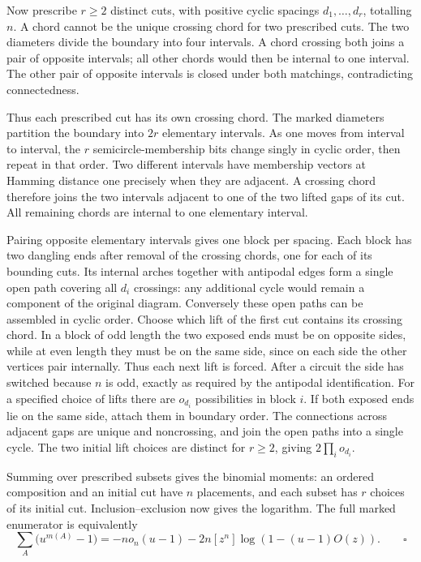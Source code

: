 Now prescribe \(r\ge2\) distinct cuts, with positive cyclic spacings
\(d_1,\ldots,d_r\), totalling \(n\). A chord cannot be the unique crossing
chord for two prescribed cuts. The two diameters divide the boundary into
four intervals. A chord crossing both joins a pair of opposite intervals;
all other chords would then be internal to one interval. The other pair of
opposite intervals is closed under both matchings, contradicting
connectedness.

Thus each prescribed cut has its own crossing chord. The marked diameters
partition the boundary into \(2r\) elementary intervals. As one moves from
interval to interval, the \(r\) semicircle-membership bits change singly in
cyclic order, then repeat in that order. Two different intervals have
membership vectors at Hamming distance one precisely when they are adjacent.
A crossing chord therefore joins the two intervals adjacent to one of the
two lifted gaps of its cut. All remaining chords are internal to one
elementary interval.

Pairing opposite elementary intervals gives one block per spacing. Each
block has two dangling ends after removal of the crossing chords, one for
each of its bounding cuts. Its internal arches together with antipodal
edges form a single open path covering all \(d_i\) crossings: any additional
cycle would remain a component of the original diagram. Conversely these
open paths can be assembled in cyclic order. Choose which lift of the first
cut contains its crossing chord. In a block of odd length the two exposed
ends must be on opposite sides, while at even length they must be on the
same side, since on each side the other vertices pair internally. Thus
each next lift is forced. After a circuit the side has switched because
\(n\) is odd, exactly as required by the antipodal identification. For a
specified choice of lifts there are \(o_{d_i}\) possibilities in block
\(i\). If both exposed ends lie on the same side, attach them in boundary
order. The connections across adjacent gaps are unique and noncrossing,
and join the open paths into a single cycle. The two initial lift choices
are distinct for \(r\ge2\), giving \(2\prod_i o_{d_i}\).

Summing over prescribed subsets gives the binomial moments: an ordered
composition and an initial cut have \(n\) placements, and each subset has
\(r\) choices of its initial cut. Inclusion--exclusion now gives the
logarithm. The full marked enumerator is equivalently
\[
 \sum_A\bigl(u^{m(A)}-1\bigr)
 =-n o_n(u-1)-2n[z^n]\log\!\left(1-(u-1)O(z)\right).
 \qquad\square
\]


